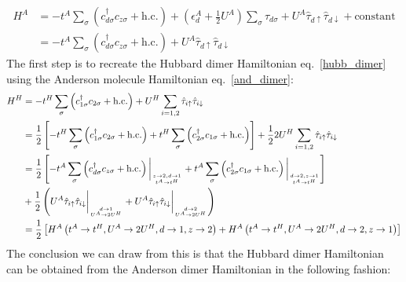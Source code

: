 \documentclass{report}
\numberwithin{equation}{section}
\begin{document}
\begin{equation}\begin{aligned}
	\label{and_dimer}
	H^A &= -t^A\sum_{\sigma}\left(c^\dagger_{d\sigma}c_{z\sigma} + \text{h.c.}\right) + \left(\epsilon_d^A + \frac{1}{2}U^A\right) \sum_{\sigma}\hat \tau_{d\sigma} + U^A\hat \tau_{d \uparrow}\hat \tau_{d \downarrow} + \text{constant}\\
	    &= -t^A\sum_{\sigma}\left(c^\dagger_{d\sigma}c_{z\sigma} + \text{h.c.}\right) + U^A\hat \tau_{d \uparrow}\hat \tau_{d \downarrow}
\end{aligned}\end{equation}
The first step is to recreate the Hubbard dimer Hamiltonian eq.~\ref{hubb_dimer} using the Anderson molecule Hamiltonian eq.~\ref{and_dimer}:
\begin{equation}\begin{aligned}
	H^H &= -t^H\sum_{\sigma}\left(c^\dagger_{1\sigma}c_{2\sigma} + \text{h.c.}\right) + U^H\sum_{i=1,2}\hat \tau_{i \uparrow}\hat \tau_{i \downarrow}\\
	    &= \frac{1}{2}\left[-t^H\sum_{\sigma}\left(c^\dagger_{1\sigma}c_{2\sigma} + \text{h.c.}\right) + t^H\sum_{\sigma}\left(c^\dagger_{2\sigma}c_{1\sigma} + \text{h.c.}\right)\right] + \frac{1}{2} 2U^H\sum_{i=1,2}\hat \tau_{i \uparrow}\hat \tau_{i \downarrow}\\
	    &= \frac{1}{2}\left[-t^A\sum_{\sigma}\left(c^\dagger_{d\sigma}c_{z\sigma} + \text{h.c.}\right)\bigg\vert_{z \to 2, d \to 1\atop{t^A \to t^H}} + t^A\sum_{\sigma}\left(c^\dagger_{2\sigma}c_{1\sigma} + \text{h.c.}\right)\bigg\vert_{d \to 2,z \to 1\atop{t^A \to t^H}} \right] \\
	    &+ \frac{1}{2} \left(U^A\hat \tau_{i \uparrow}\hat \tau_{i \downarrow}\bigg\vert_{d \to 1\atop{U^A \to 2U^H}} + U^A\hat \tau_{i \uparrow}\hat \tau_{i \downarrow}\bigg\vert_{d \to 2\atop{U^A \to 2U^H}}\right)\\
	    &=\frac{1}{2}\left[H^A\left(t^A \to t^H, U^A \to 2U^H, d \to 1, z \to 2\right) + H^A\left(t^A \to t^H, U^A \to 2U^H, d \to 2, z \to 1\right)\right]
\end{aligned}\end{equation}
The conclusion we can draw from this is that the Hubbard dimer Hamiltonian can be obtained from the Anderson dimer Hamiltonian in the following fashion:
\end{document}
